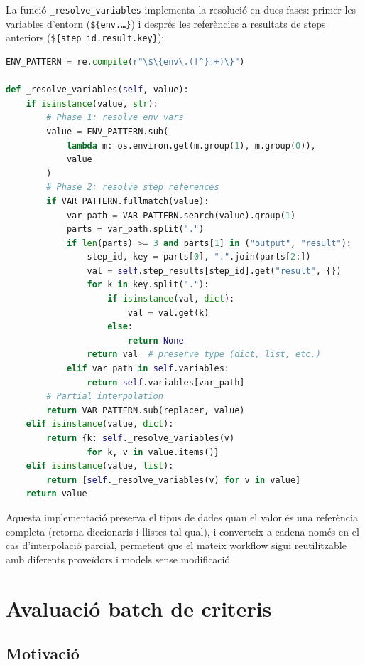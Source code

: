\documentclass[12pt,a4paper,twoside]{report}
\begin{document}
La funci\'o \texttt{\_resolve\_variables} implementa la resoluci\'o en dues fases: primer les variables d'entorn (\texttt{\$\{env.\dots\}}) i despr\'es les refer\`encies a resultats de steps anteriors (\texttt{\$\{step\_id.result.key\}}):

\begin{lstlisting}[language=Python]
ENV_PATTERN = re.compile(r"\$\{env\.([^}]+)\}")

def _resolve_variables(self, value):
    if isinstance(value, str):
        # Phase 1: resolve env vars
        value = ENV_PATTERN.sub(
            lambda m: os.environ.get(m.group(1), m.group(0)),
            value
        )
        # Phase 2: resolve step references
        if VAR_PATTERN.fullmatch(value):
            var_path = VAR_PATTERN.search(value).group(1)
            parts = var_path.split(".")
            if len(parts) >= 3 and parts[1] in ("output", "result"):
                step_id, key = parts[0], ".".join(parts[2:])
                val = self.step_results[step_id].get("result", {})
                for k in key.split("."):
                    if isinstance(val, dict):
                        val = val.get(k)
                    else:
                        return None
                return val  # preserve type (dict, list, etc.)
            elif var_path in self.variables:
                return self.variables[var_path]
        # Partial interpolation
        return VAR_PATTERN.sub(replacer, value)
    elif isinstance(value, dict):
        return {k: self._resolve_variables(v)
                for k, v in value.items()}
    elif isinstance(value, list):
        return [self._resolve_variables(v) for v in value]
    return value
\end{lstlisting}

Aquesta implementaci\'o preserva el tipus de dades quan el valor \'es una refer\`encia completa (retorna diccionaris i llistes tal qual), i converteix a cadena nom\'es en el cas d'interpolaci\'o parcial, permetent que el mateix workflow sigui reutilitzable amb diferents prove\"idors i models sense modificaci\'o.

\section{Avaluaci\'o batch de criteris}
\label{subsec:batch-eval}

\subsection{Motivaci\'o}
\end{document}
